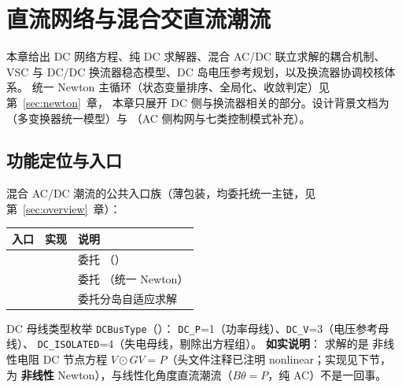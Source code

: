 \section{直流网络与混合交直流潮流}\label{sec:hybrid}

本章给出 DC 网络方程、纯 DC 求解器、混合 AC/DC 联立求解的耦合机制、
VSC 与 DC/DC 换流器稳态模型、DC 岛电压参考规划，以及换流器协调校核体系。
统一 Newton 主循环（状态变量排序、全局化、收敛判定）见第~\ref{sec:newton}~章，
本章只展开 DC 侧与换流器相关的部分。设计背景文档为
（多变换器统一模型）与
（AC 侧构网与七类控制模式补充）。

\subsection{功能定位与入口}

混合 AC/DC 潮流的公共入口族（薄包装，均委托统一主链，见第~\ref{sec:overview}~章）：

\begin{center}
\footnotesize
\begin{tabular}{@{}L{4.2cm}L{4.6cm}L{6.2cm}@{}}
\toprule
入口 & 实现 & 说明\\
\midrule
{} &  & 委托 （）\\
 &  & 委托 （统一 Newton）\\
 &  & 委托分岛自适应求解\\
\bottomrule
\end{tabular}
\end{center}

DC 母线类型枚举 \texttt{DCBusType}（）：
\texttt{DC\_P}=1（功率母线）、\texttt{DC\_V}=3（电压参考母线）、
\texttt{DC\_ISOLATED}=4（失电母线，剔除出方程组）。
\textbf{如实说明}： 求解的是
非线性电阻 DC 节点方程 $V\odot GV=P$（头文件注释已注明 nonlinear；实现见下节，
为 \textbf{非线性} Newton），与线性化角度直流潮流（$B\theta=P$，纯 AC）不是一回事。

